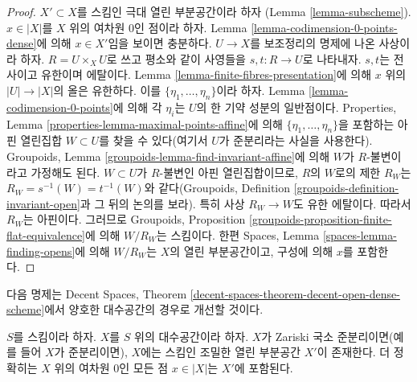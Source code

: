 \begin{proof}
$X' \subset X$를 스킴인 극대 열린 부분공간이라 하자
(Lemma \ref{lemma-subscheme}).
$x \in |X|$를 $X$ 위의 여차원 $0$인 점이라 하자.
Lemma \ref{lemma-codimension-0-points-dense}에 의해 $x \in X'$임을
보이면 충분하다. $U \to X$를 보조정리의 명제에 나온 사상이라 하자.
$R = U \times_X U$로 쓰고 평소와 같이 사영들을
$s, t : R \to U$로 나타내자. $s, t$는 전사이고 유한이며 에탈이다.
Lemma \ref{lemma-finite-fibres-presentation}에 의해 $x$ 위의
$|U| \to |X|$의 올은 유한하다. 이를
$\{\eta_1, \ldots, \eta_n\}$이라 하자. Lemma
\ref{lemma-codimension-0-points}에 의해 각 $\eta_i$는 $U$의 한 기약
성분의 일반점이다. Properties, Lemma
\ref{properties-lemma-maximal-points-affine}에 의해
$\{\eta_1, \ldots, \eta_n\}$을 포함하는 아핀 열린집합
$W \subset U$를 찾을 수 있다(여기서 $U$가 준분리라는 사실을 사용한다).
Groupoids, Lemma \ref{groupoids-lemma-find-invariant-affine}에 의해
$W$가 $R$-불변이라고 가정해도 된다.
$W \subset U$가 $R$-불변인 아핀 열린집합이므로, $R$의 $W$로의 제한
$R_W$는 $R_W = s^{-1}(W) = t^{-1}(W)$와 같다(Groupoids, Definition
\ref{groupoids-definition-invariant-open}과 그 뒤의 논의를 보라).
특히 사상 $R_W \to W$도 유한 에탈이다. 따라서 $R_W$는 아핀이다.
그러므로 Groupoids, Proposition
\ref{groupoids-proposition-finite-flat-equivalence}에 의해
$W/R_W$는 스킴이다. 한편 Spaces, Lemma
\ref{spaces-lemma-finding-opens}에 의해 $W/R_W$는 $X$의 열린 부분공간이고,
구성에 의해 $x$를 포함한다.
\end{proof}

\noindent
다음 명제는 Decent Spaces, Theorem
\ref{decent-spaces-theorem-decent-open-dense-scheme}에서 양호한 대수공간의
경우로 개선할 것이다.

\begin{proposition}
\label{proposition-locally-quasi-separated-open-dense-scheme}
$S$를 스킴이라 하자. $X$를 $S$ 위의 대수공간이라 하자. $X$가
Zariski 국소 준분리이면(예를 들어 $X$가 준분리이면), $X$에는 스킴인
조밀한 열린 부분공간 $X'$이 존재한다. 더 정확히는 $X$ 위의 여차원
$0$인 모든 점 $x \in |X|$는 $X'$에 포함된다.
\end{proposition}

